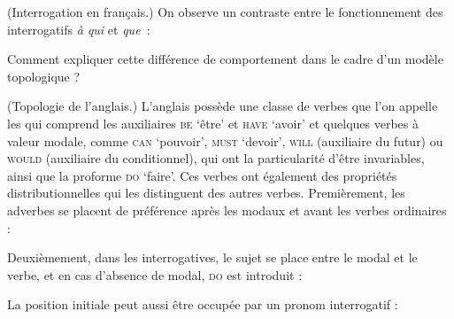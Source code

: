 {     (Interrogation en français.) On observe un contraste entre le fonctionnement des interrogatifs \textit{à qui} et \textit{que~}:
    
    \begin{exe}
    \sn
    \begin{xlista}
    \end{xlista}
    \end{exe}
    Comment expliquer cette différence de comportement dans le cadre d’un modèle topologique ?

     (Topologie de l’anglais.) L’anglais possède une classe de verbes que l’on appelle les  qui comprend les auxiliaires \textsc{be} ‘être’ et \textsc{have} ‘avoir’ et quelques verbes à valeur modale, comme \textsc{can} ‘pouvoir’, \textsc{must} ‘devoir’, \textsc{will} (auxiliaire du futur) ou \textsc{would} (auxiliaire du conditionnel), qui ont la particularité d’être invariables, ainsi que la proforme \textsc{do} ‘faire’. Ces verbes ont également des propriétés distributionnelles qui les distinguent des autres verbes. Premièrement, les adverbes se placent de préférence après les modaux et avant les verbes ordinaires :
    
    \begin{exe}
    \begin{xlista}
    \end{xlista}
    \end{exe}
    Deuxièmement, dans les interrogatives, le sujet se place entre le modal et le verbe, et en cas d’absence de modal, \textsc{do} est introduit :
    
    \begin{exe}
    \begin{xlista}
    \end{xlista}
    \end{exe}
    La position initiale peut aussi être occupée par un pronom interrogatif :
    
}
